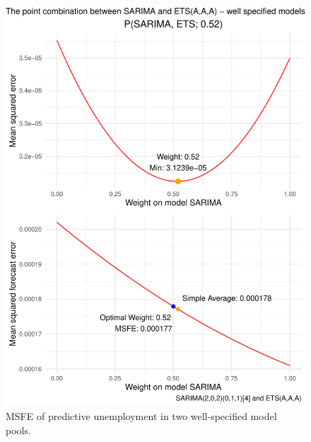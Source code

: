 \begin{frame}[plain]{}

\begin{columns}
    \begin{column}{0.5\textwidth}
        \begin{figure}[ht]
        \centering
        \includegraphics[scale=0.37]{Graph/EMPL_correct.pdf}
        \caption{\footnotesize{MSFE of predictive unemployment in two well-specified model pools.}}
        \end{figure}
    \end{column}
    

\end{columns}
\end{frame}
